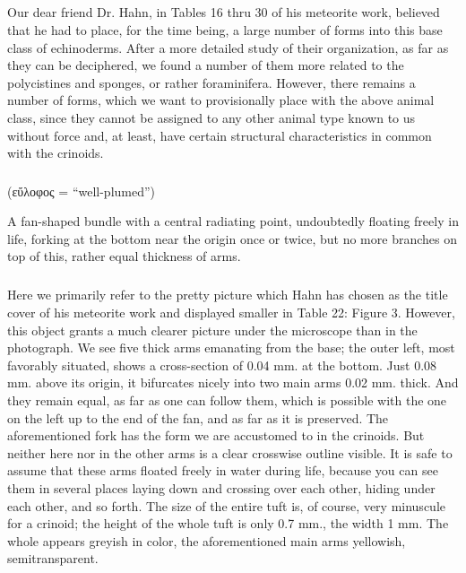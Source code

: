 \documentclass[a4paper, 12pt, oneside]{article}
\begin{document}
\subsection{}
\paragraph*{}
Our dear friend Dr. Hahn, in Tables 16 thru 30 of his meteorite work, believed that he had to place, for the time being, a large number of forms into this base class of echinoderms. After a more detailed study of their organization, as far as they can be deciphered, we found a number of them more related to the polycistines and sponges, or rather foraminifera. However, there remains a number of forms, which we want to provisionally place with the above animal class, since they cannot be assigned to any other animal type known to us without force and, at least, have certain structural characteristics in common with the crinoids.
\subsubsection{}
\paragraph*{}
(εὔλοφος = ``well-plumed'')%

A fan-shaped bundle with a central radiating point, undoubtedly floating freely in life, forking at the bottom near the origin once or twice, but no more branches on top of this, rather equal thickness of arms.
\paragraph{\large{}}
\subparagraph{}
Here we primarily refer to the pretty picture which Hahn has chosen as the title cover of his meteorite work and displayed smaller in Table 22: Figure 3. However, this object grants a much clearer picture under the microscope than in the photograph. We see five thick arms emanating from the base; the outer left, most favorably situated, shows a cross-section of 0.04 mm. at the bottom. Just 0.08 mm. above its origin, it bifurcates nicely into two main arms 0.02 mm. thick. And they remain equal, as far as one can follow them, which is possible with the one on the left up to the end of the fan, and as far as it is preserved. The aforementioned fork has the form we are accustomed to in the crinoids. But neither here nor in the other arms is a clear crosswise outline visible. It is safe to assume that these arms floated freely in water during life, because you can see them in several places laying down and crossing over each other, hiding under each other, and so forth. The size of the entire tuft is, of course, very minuscule for a crinoid; the height of the whole tuft is only 0.7 mm., the width 1 mm. The whole appears greyish in color, the aforementioned main arms yellowish, semitransparent.
\end{document}
